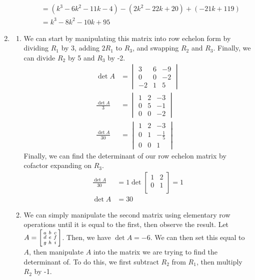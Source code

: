 \documentclass[11pt, letterpaper, twoside]{article}
\begin{document}
\begin{enumerate}
\begin{enumerate}[label=(\alph*)]
\begin{align*}
&=(k^3-6k^2-11k-4)-(2k^2-22k+20)+(-21k+119)\\
&=\boxed{k^3-8k^2-10k+95}
\end{align*}
\end{enumerate}
\item
\begin{enumerate}[label=(\alph*)]
\item We can start by manipulating this matrix into row echelon form by dividing $R_1$ by 3, adding $2R_1$ to $R_3$, and swapping $R_2$ and $R_3$. Finally, we can divide $R_2$ by 5 and $R_3$ by -2.
\begin{align*}
\det A&=\begin{vmatrix}
3 & 6 & -9\\
0 & 0 & -2\\
-2 & 1 & 5
\end{vmatrix}\\
\frac{\det A}{3}&=\begin{vmatrix}
1 & 2 & -3\\
0 & 5 & -1\\
0 & 0 & -2
\end{vmatrix}\\
\frac{\det A}{30}&=\begin{vmatrix}
1 & 2 & -3\\
0 & 1 & -\frac{1}{5}\\
0 & 0 & 1
\end{vmatrix}
\end{align*}
Finally, we can find the determinant of our row echelon matrix by cofactor expanding on $R_3$.
\begin{align*}\frac{\det A}{30}&=1\det\begin{bmatrix}
1 & 2\\
0 & 1\\
\end{bmatrix}=1\\
\det A &= 30
\end{align*}
\item
We can simply manipulate the second matrix using elementary row operations until it is equal to the first, then observe the result. Let
$A=\begin{bsmallmatrix}
a & b & c\\
d & e & f\\
g & h & i
\end{bsmallmatrix}$. Then, we have $\det A = -6$. We can then set this equal to $A$, then manipulate $A$ into the matrix we are trying to find the determinant of. To do this, we first subtract $R_2$ from $R_1$, then multiply $R_2$ by -1.\pagebreak

\end{enumerate}
\end{enumerate}
\end{document}
